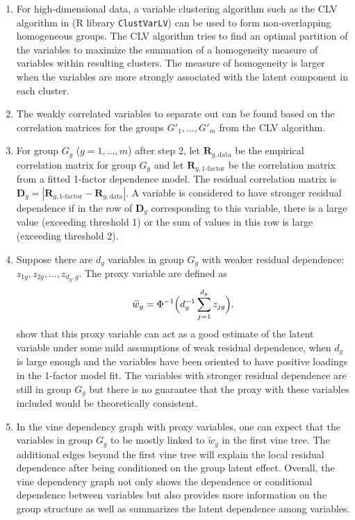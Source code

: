 \documentclass[a4paper]{article}
\def\bfr{{\bm{R}}}
\def\tildew{\widetilde{w}}
\begin{document}
\begin{enumerate}

\item For high-dimensional data, a variable clustering algorithm such
  as the CLV algorithm in \cite{vigneau2003clustering} (R library
  \texttt{ClustVarLV}) can be used to form non-overlapping homogeneous
  groups.  The CLV algorithm tries to find an optimal partition of the
  variables to maximize the summation of a homogeneity measure of
  variables within resulting clusters.  The measure of homogeneity is
  larger when the variables are more strongly associated with the
  latent component in each cluster.
\item The weakly correlated variables to separate out can be found
  based on the correlation matrices for the groups $G'_1,\ldots,G'_m$
  from the CLV algorithm.
\item For group $G_g$ ($g=1,\ldots,m$) after step 2, let
  $\bfr_{g,\text{data}}$ be the empirical correlation matrix for group
  $G_g$ and let $\bfr_{g,\text{1-factor}}$ be the correlation matrix
  from a fitted 1-factor dependence model. The residual correlation
  matrix is
  $\bm{D}_g=|\bfr_{g,\text{1-factor}}-\bfr_{g,\text{data}}|$.  A
  variable is considered to have stronger residual dependence if in
  the row of $\bm{D}_g$ corresponding to this variable, there is a
  large value (exceeding threshold 1) or the sum of values in this row
  is large (exceeding threshold 2).
\item Suppose there are $d_g$ variables in group $G_g$ with weaker
  residual dependence: $z_{1g},z_{2g},\ldots,z_{d_g,g}$.  The proxy
  variable are defined as
\begin{equation}
  \label{eq-proxy}
  \tildew_{g}=\Phi^{-1}\Bigl(d_g^{-1}\sum_{j=1}^{d_g}z_{jg}\Bigr).
\end{equation}
\cite{krupskii2022approximate} show that this proxy variable can act
as a good estimate of the latent variable under some mild assumptions
of weak residual dependence, when $d_g$ is large enough and the
variables have been oriented to have positive loadings in the 1-factor
model fit.  The variables with stronger residual dependence are still
in group $G_g$ but there is no guarantee that the proxy with these
variables included would be theoretically consistent.
   
\item In the vine dependency graph with proxy variables, one can
  expect that the variables in group $G_g$ to be mostly linked to
  $\tildew_g$ in the first vine tree.  The additional edges beyond the
  first vine tree will explain the local residual dependence after
  being conditioned on the group latent effect.  Overall, the vine
  dependency graph not only shows the dependence or conditional
  dependence between variables but also provides more information on
  the group structure as well as summarizes the latent dependence
  among variables.
\end{enumerate}
\end{document}
